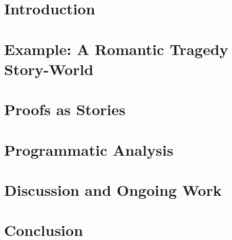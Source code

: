 \section{Introduction}



\section{Example: A Romantic Tragedy Story-World}



\section{Proofs as Stories}



\section{Programmatic Analysis}



\section{Discussion and Ongoing Work}



\section{Conclusion}



